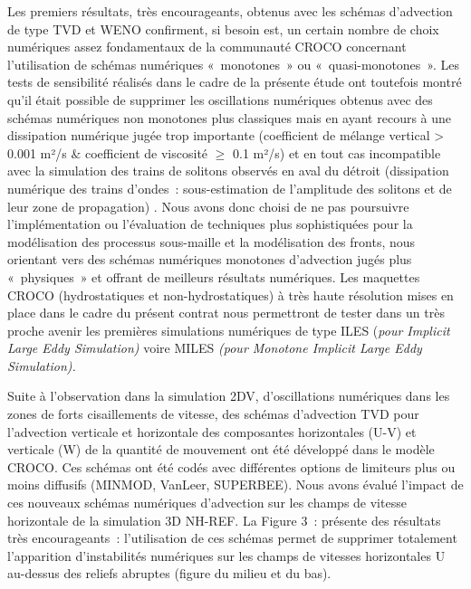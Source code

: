 \documentclass[12pt]{article}
\begin{document}
\begin{adjustwidth}{0.0in}{0.4in}
\begin{justify}
Les premiers résultats, très encourageants, obtenus avec les schémas d’advection de type TVD et WENO confirment, si besoin est, un certain nombre de choix numériques assez fondamentaux de la communauté CROCO concernant l’utilisation de schémas numériques « monotones » ou « quasi-monotones ». Les tests de sensibilité réalisés dans le cadre de la présente étude ont toutefois montré qu’il était possible de supprimer les oscillations numériques obtenus avec des schémas numériques non monotones plus classiques mais en ayant recours à une dissipation numérique jugée trop importante (coefficient de mélange vertical > 0.001 m²/s $\&$  coefficient de viscosité $ \geq $  0.1 m²/s) et en tout cas incompatible avec la simulation des trains de solitons observés en aval du détroit (dissipation numérique des trains d’ondes : sous-estimation de l’amplitude des solitons et de leur zone de propagation) . Nous avons donc choisi de ne pas poursuivre l’implémentation ou l’évaluation de techniques plus sophistiquées pour la modélisation des processus sous-maille et la modélisation des fronts, nous orientant vers des schémas numériques monotones d’advection jugés plus « physiques » et offrant de meilleurs résultats numériques. Les maquettes CROCO (hydrostatiques et non-hydrostatiques) à très haute résolution mises en place dans le cadre du présent contrat nous permettront de tester dans un très proche avenir les premières simulations numériques de type ILES (\textit{pour Implicit Large Eddy Simulation) }voire MILES \textit{(pour Monotone Implicit Large Eddy Simulation).}
\end{justify}\par

\end{adjustwidth}


\vspace{\baselineskip}
\begin{justify}
Suite à l’observation dans la simulation 2DV, d’oscillations numériques dans les zones de forts cisaillements de vitesse, des schémas d’advection TVD pour l’advection verticale et horizontale des composantes horizontales (U-V) et verticale (W) de la quantité de mouvement ont été développé dans le modèle CROCO. Ces schémas ont été codés avec différentes options de limiteurs plus ou moins diffusifs (MINMOD, VanLeer, SUPERBEE). Nous avons évalué l’impact de ces nouveaux schémas numériques d’advection sur les champs de vitesse horizontale de la simulation 3D NH-REF. La Figure 3 : présente des résultats très encourageants : l’utilisation de ces schémas permet de supprimer totalement l’apparition d’instabilités numériques sur les champs de vitesses horizontales U au-dessus des reliefs abruptes (figure du milieu et du bas).
\end{justify}\par
\end{document}
